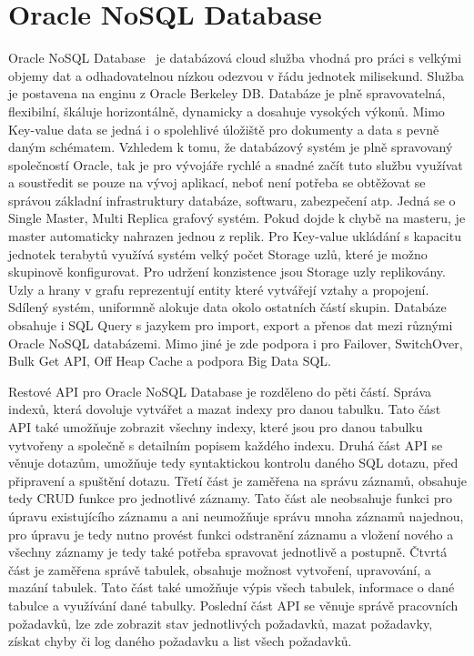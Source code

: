 \documentclass[czech,master,dept460,male,csharp,cpdeclaration]{diploma}
\begin{document}
	\section{Oracle NoSQL Database}
	
	Oracle NoSQL Database~\cite{oraclenosqldb} je databázová cloud služba vhodná pro práci s velkými objemy dat a odhadovatelnou nízkou odezvou v řádu jednotek milisekund. Služba je postavena na enginu z Oracle Berkeley DB. Databáze je plně spravovatelná, flexibilní, škáluje horizontálně, dynamicky a dosahuje vysokých výkonů. Mimo Key-value data se jedná i o spolehlivé úložiště pro dokumenty a data s pevně daným schématem. Vzhledem k tomu, že databázový systém je plně spravovaný společností Oracle, tak je pro vývojáře rychlé a snadné začít tuto službu využívat a soustředit se pouze na vývoj aplikací, neboť není potřeba se obtěžovat se správou základní infrastruktury databáze, softwaru, zabezpečení atp. Jedná se o Single Master, Multi Replica grafový systém. Pokud dojde k chybě na masteru, je master automaticky nahrazen jednou z replik. Pro Key-value ukládání s kapacitu jednotek terabytů využívá systém velký počet Storage uzlů, které je možno skupinově konfigurovat. Pro udržení konzistence jsou Storage uzly replikovány. Uzly a hrany v grafu reprezentují entity které vytvářejí vztahy a propojení. Sdílený systém, uniformně alokuje data okolo ostatních částí skupin. Databáze obsahuje i SQL Query s jazykem pro import, export a přenos dat mezi různými Oracle NoSQL databázemi. Mimo jiné je zde podpora i pro Failover, SwitchOver, Bulk Get API, Off Heap Cache a podpora Big Data SQL.
	
	Restové API pro Oracle NoSQL Database je rozděleno do pěti částí. Správa indexů, která dovoluje vytvářet a mazat indexy pro danou tabulku. Tato část API také umožňuje zobrazit všechny indexy, které jsou pro danou tabulku vytvořeny a společně s detailním popisem každého indexu. Druhá část API se věnuje dotazům, umožňuje tedy syntaktickou kontrolu daného SQL dotazu, před připravení a spuštění dotazu. Třetí část je zaměřena na správu záznamů, obsahuje tedy CRUD funkce pro jednotlivé záznamy. Tato část ale neobsahuje funkci pro úpravu existujícího záznamu a ani neumožňuje správu mnoha záznamů najednou, pro úpravu je tedy nutno provést funkci odstranění záznamu a vložení nového a všechny záznamy je tedy také potřeba spravovat jednotlivě a postupně. Čtvrtá část je zaměřena správě tabulek, obsahuje možnost vytvoření, upravování, a mazání tabulek. Tato část také umožňuje výpis všech tabulek, informace o dané tabulce a využívání dané tabulky. Poslední část API se věnuje správě pracovních požadavků, lze zde zobrazit stav jednotlivých požadavků, mazat požadavky, získat chyby či log daného požadavku a list všech požadavků.
		
\end{document}
